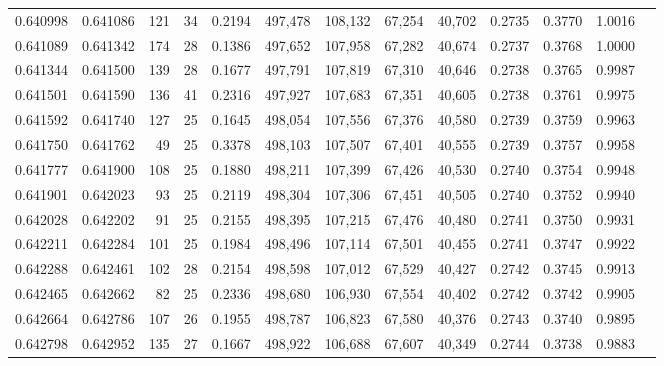 \begin{tabular}{rrrrrrrrrrrrr}
0.640998 & 0.641086 &   121 &  34 &                                     0.2194 & 497,478 & 108,132 &  67,254 &  40,702 & 0.2735 & 0.3770 & 1.0016 \\
0.641089 & 0.641342 &   174 &  28 &                                     0.1386 & 497,652 & 107,958 &  67,282 &  40,674 & 0.2737 & 0.3768 & 1.0000 \\
0.641344 & 0.641500 &   139 &  28 &                                     0.1677 & 497,791 & 107,819 &  67,310 &  40,646 & 0.2738 & 0.3765 & 0.9987 \\
0.641501 & 0.641590 &   136 &  41 &                                     0.2316 & 497,927 & 107,683 &  67,351 &  40,605 & 0.2738 & 0.3761 & 0.9975 \\
0.641592 & 0.641740 &   127 &  25 &                                     0.1645 & 498,054 & 107,556 &  67,376 &  40,580 & 0.2739 & 0.3759 & 0.9963 \\
0.641750 & 0.641762 &    49 &  25 &                                     0.3378 & 498,103 & 107,507 &  67,401 &  40,555 & 0.2739 & 0.3757 & 0.9958 \\
0.641777 & 0.641900 &   108 &  25 &                                     0.1880 & 498,211 & 107,399 &  67,426 &  40,530 & 0.2740 & 0.3754 & 0.9948 \\
0.641901 & 0.642023 &    93 &  25 &                                     0.2119 & 498,304 & 107,306 &  67,451 &  40,505 & 0.2740 & 0.3752 & 0.9940 \\
0.642028 & 0.642202 &    91 &  25 &                                     0.2155 & 498,395 & 107,215 &  67,476 &  40,480 & 0.2741 & 0.3750 & 0.9931 \\
0.642211 & 0.642284 &   101 &  25 &                                     0.1984 & 498,496 & 107,114 &  67,501 &  40,455 & 0.2741 & 0.3747 & 0.9922 \\
0.642288 & 0.642461 &   102 &  28 &                                     0.2154 & 498,598 & 107,012 &  67,529 &  40,427 & 0.2742 & 0.3745 & 0.9913 \\
0.642465 & 0.642662 &    82 &  25 &                                     0.2336 & 498,680 & 106,930 &  67,554 &  40,402 & 0.2742 & 0.3742 & 0.9905 \\
0.642664 & 0.642786 &   107 &  26 &                                     0.1955 & 498,787 & 106,823 &  67,580 &  40,376 & 0.2743 & 0.3740 & 0.9895 \\
0.642798 & 0.642952 &   135 &  27 &                                     0.1667 & 498,922 & 106,688 &  67,607 &  40,349 & 0.2744 & 0.3738 & 0.9883 \\

\end{tabular}

